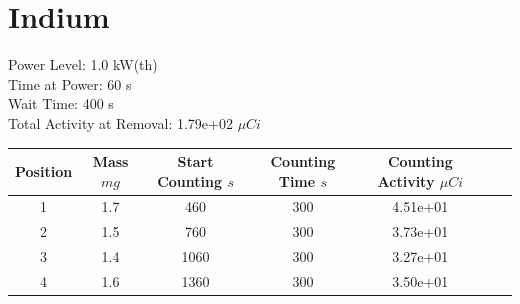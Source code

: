 \newpage

\section*{ Indium }

Power Level: 1.0 kW(th) \\
Time at Power: 60 s \\
Wait Time: 400 s \\
Total Activity at Removal: 1.79e+02 $\mu Ci$

\begin{table}[h]
\centering
\begin{tabular}{ |c|c|c|c|c|c|c| }
 \hline
 Position & Mass $mg$ & Start Counting $s$ & Counting Time $s$ & Counting Activity $\mu Ci$ \\
 \hline 
 1 & 1.7 & 460 & 300 & 4.51e+01\\ 
\hline
 2 & 1.5 & 760 & 300 & 3.73e+01\\ 
\hline
 3 & 1.4 & 1060 & 300 & 3.27e+01\\ 
\hline
 4 & 1.6 & 1360 & 300 & 3.50e+01\\ 
\hline
\end{tabular}
\end{table}

\begin{figure}[!ht]
   \centering
   \quad
   \\ 
   \quad 

\end{figure}

